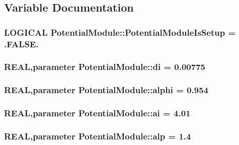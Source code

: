 \subsection{Variable Documentation}
\hypertarget{namespace_potential_module_a56b866590823c5b1d9c82b7aa77daf9e}{
\subsubsection[{PotentialModuleIsSetup}]{\setlength{\rightskip}{0pt plus 5cm}LOGICAL {\bf PotentialModule::PotentialModuleIsSetup} = .FALSE.}}
\label{namespace_potential_module_a56b866590823c5b1d9c82b7aa77daf9e}
\hypertarget{namespace_potential_module_a0da530bc0742919bd0e53de92f6e02fa}{
\subsubsection[{di}]{\setlength{\rightskip}{0pt plus 5cm}REAL,parameter {\bf PotentialModule::di} = 0.00775}}
\label{namespace_potential_module_a0da530bc0742919bd0e53de92f6e02fa}
\hypertarget{namespace_potential_module_ad9531fa451a7ae33ff2d7c264831bbd3}{
\subsubsection[{alphi}]{\setlength{\rightskip}{0pt plus 5cm}REAL,parameter {\bf PotentialModule::alphi} = 0.954}}
\label{namespace_potential_module_ad9531fa451a7ae33ff2d7c264831bbd3}
\hypertarget{namespace_potential_module_a5c9cc4bf368687b35bb242530da5756a}{
\subsubsection[{ai}]{\setlength{\rightskip}{0pt plus 5cm}REAL,parameter {\bf PotentialModule::ai} = 4.01}}
\label{namespace_potential_module_a5c9cc4bf368687b35bb242530da5756a}
\hypertarget{namespace_potential_module_aa93c85860f19c102f0310f46e0ee9aea}{
\subsubsection[{alp}]{\setlength{\rightskip}{0pt plus 5cm}REAL,parameter {\bf PotentialModule::alp} = 1.4}}
